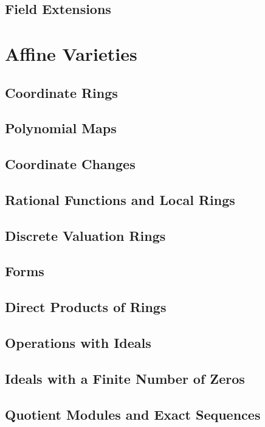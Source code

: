 \documentclass[oneside]{amsbook}
\numberwithin{prob}{chapter}
\begin{document}
\section{Field Extensions}


\chapter{Affine Varieties}
\section{Coordinate Rings}

\section{Polynomial Maps}

\section{Coordinate Changes}

\section{Rational Functions and Local Rings}

\section{Discrete Valuation Rings}

\section{Forms}

\section{Direct Products of Rings}

\section{Operations with Ideals}

\section{Ideals with a Finite Number of Zeros}

\section{Quotient Modules and Exact Sequences}

\end{document}
